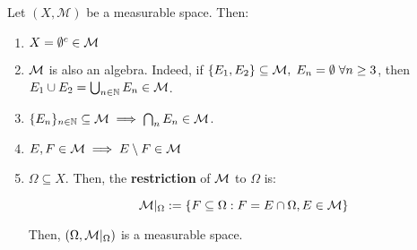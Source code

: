\begin{fproperties}
    Let $(X, \mathcal{M})$ be a measurable space. Then:

    \vspace{1em}

    \begin{enumerate}[label=(\roman*)]
        \item $X = \emptyset^c \in \mathcal{M}$
        
        \vspace{0.5em}
    
        \item $\mathcal{M}$ is also an algebra. Indeed, if $\{E_1, E_2\} \subseteq \mathcal{M},\; E_n = \emptyset \; \forall n \geq 3$,
        then $E_1 \cup E_2 = \bigcup_{n \in \mathbb{N}} E_n \in \mathcal{M}$.

        \vspace{0.5em}

        \item $\{E_n\}_{n \in \mathbb{N}} \subseteq \mathcal{M} \implies \bigcap_{n} E_n \in \mathcal{M}$.
        
        \vspace{0.5em}

        \item $E, F \in \mathcal{M} \implies E\setminus F \in \mathcal{M}$
        
        \vspace{0.5em}

        \item $\Omega \subseteq X$. Then, the \textbf{restriction} of $\mathcal{M}$ to $\Omega$ is:
        
        $$\mathcal{M} |_{\Omega} := \{F \subseteq \Omega: F = E \cap \Omega, E \in \mathcal{M}\}$$

        Then, $(\Omega, \mathcal{M} |_{\Omega})$ is a measurable space.
    \end{enumerate}
\end{fproperties}



